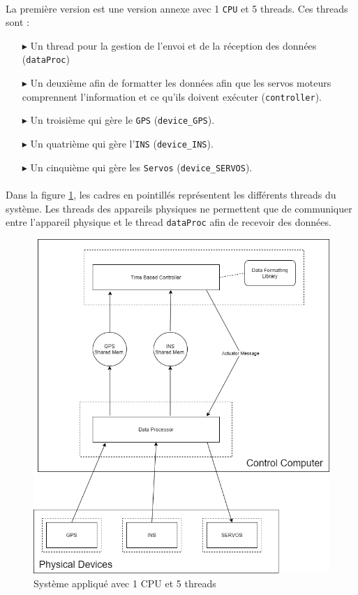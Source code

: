 \documentclass[a4paper,12pt]{report}
\begin{document}
			\paragraph*{}
			La première version est une version annexe avec 1 \texttt{CPU} et 5 threads. Ces threads sont :
			
			\begin{itemize}
				\item[$\blacktriangleright$] Un thread pour la gestion de l'envoi et de la réception des données (\texttt{dataProc})
				\item[$\blacktriangleright$] Un deuxième afin de formatter les données afin que les servos moteurs comprennent l'information et ce qu'ils doivent exécuter (\texttt{controller}).
				\item[$\blacktriangleright$] Un troisième qui gère le \texttt{GPS} (\texttt{device\_GPS}).
				\item[$\blacktriangleright$] Un quatrième qui gère l'\texttt{INS} (\texttt{device\_INS}).
				\item[$\blacktriangleright$] Un cinquième qui gère les \texttt{Servos} (\texttt{device\_SERVOS}).
			\end{itemize}
			
			\paragraph*{}
			Dans la figure \ref{v0}, les cadres en pointillés représentent les différents threads du système. Les threads des appareils physiques ne permettent que de communiquer entre l'appareil physique et le thread \texttt{dataProc} afin de recevoir des données.
			
			\begin{figure}[H]
				\centering
					\includegraphics[scale=0.4]{v0.png}
					\caption{Système appliqué avec 1 CPU et 5 threads}
				\label{v0}
			\end{figure}
			
\end{document}
